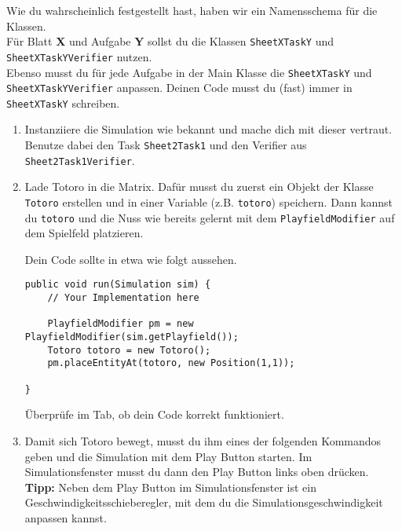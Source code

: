 

\label{ex1}
\begin{Infobox}
    Wie du wahrscheinlich festgestellt hast, haben wir ein Namensschema für die Klassen.\\
    Für Blatt \textbf{X} und Aufgabe \textbf{Y} sollst du die Klassen \lstinline{SheetXTaskY} und \lstinline{SheetXTaskYVerifier} nutzen.\\
    Ebenso musst du für jede Aufgabe in der Main Klasse die \lstinline{SheetXTaskY} und \lstinline{SheetXTaskYVerifier} anpassen.
    Deinen Code musst du (fast) immer in \lstinline{SheetXTaskY} schreiben.
\end{Infobox}

\begin{enumerate}
    \item Instanziiere die Simulation wie bekannt und mache dich mit dieser vertraut. 
        Benutze dabei den Task \lstinline{Sheet2Task1} und den Verifier aus \lstinline{Sheet2Task1Verifier}.
    \item Lade Totoro in die Matrix.
        Dafür musst du zuerst ein Objekt der Klasse \lstinline{Totoro} erstellen und in einer Variable (z.B. \lstinline{totoro}) speichern.
        Dann kannst du \lstinline{totoro} und die Nuss wie bereits gelernt mit dem \lstinline{PlayfieldModifier} auf dem Spielfeld platzieren.

        Dein Code sollte in etwa wie folgt aussehen.

        \begin{lstlisting}[firstnumber=14]
public void run(Simulation sim) {
    // Your Implementation here

    PlayfieldModifier pm = new PlayfieldModifier(sim.getPlayfield());
    Totoro totoro = new Totoro();
    pm.placeEntityAt(totoro, new Position(1,1));

}
        \end{lstlisting}

        Überprüfe im  Tab, ob dein Code korrekt funktioniert.
        \item Damit sich Totoro bewegt, musst du ihm eines der folgenden Kommandos geben und die Simulation mit dem Play Button starten. 
        Im Simulationsfenster musst du dann den Play Button links oben drücken. \\
        \textbf{Tipp:} Neben dem Play Button im Simulationsfenster ist ein Geschwindigkeitsschieberegler, mit dem du die Simulationsgeschwindigkeit anpassen kannst.


\end{enumerate}

